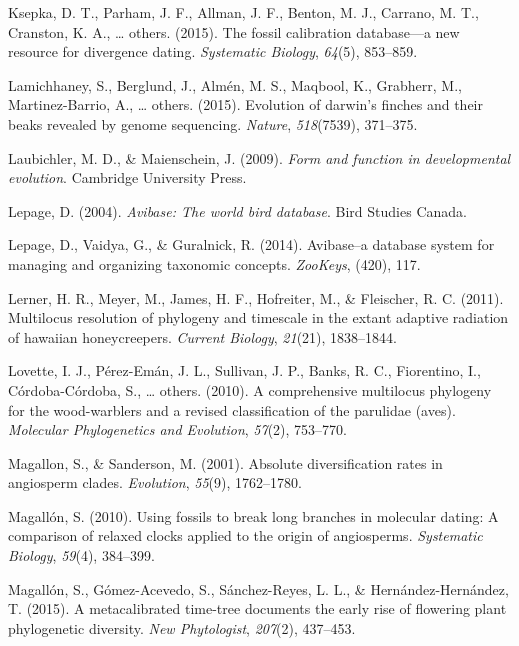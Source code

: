 \documentclass[english,man]{apa6}
\begin{document}
\leavevmode\hypertarget{ref-ksepka2015fossil}{}%
Ksepka, D. T., Parham, J. F., Allman, J. F., Benton, M. J., Carrano, M. T., Cranston, K. A., \ldots{} others. (2015). The fossil calibration database---a new resource for divergence dating. \emph{Systematic Biology}, \emph{64}(5), 853--859.

\leavevmode\hypertarget{ref-lamichhaney2015evolution}{}%
Lamichhaney, S., Berglund, J., Almén, M. S., Maqbool, K., Grabherr, M., Martinez-Barrio, A., \ldots{} others. (2015). Evolution of darwin's finches and their beaks revealed by genome sequencing. \emph{Nature}, \emph{518}(7539), 371--375.

\leavevmode\hypertarget{ref-laubichler2009form}{}%
Laubichler, M. D., \& Maienschein, J. (2009). \emph{Form and function in developmental evolution}. Cambridge University Press.

\leavevmode\hypertarget{ref-lepage2004avibase}{}%
Lepage, D. (2004). \emph{Avibase: The world bird database}. Bird Studies Canada.

\leavevmode\hypertarget{ref-lepage2014avibase}{}%
Lepage, D., Vaidya, G., \& Guralnick, R. (2014). Avibase--a database system for managing and organizing taxonomic concepts. \emph{ZooKeys}, (420), 117.

\leavevmode\hypertarget{ref-lerner2011multilocus}{}%
Lerner, H. R., Meyer, M., James, H. F., Hofreiter, M., \& Fleischer, R. C. (2011). Multilocus resolution of phylogeny and timescale in the extant adaptive radiation of hawaiian honeycreepers. \emph{Current Biology}, \emph{21}(21), 1838--1844.

\leavevmode\hypertarget{ref-lovette2010comprehensive}{}%
Lovette, I. J., Pérez-Emán, J. L., Sullivan, J. P., Banks, R. C., Fiorentino, I., Córdoba-Córdoba, S., \ldots{} others. (2010). A comprehensive multilocus phylogeny for the wood-warblers and a revised classification of the parulidae (aves). \emph{Molecular Phylogenetics and Evolution}, \emph{57}(2), 753--770.

\leavevmode\hypertarget{ref-magallon2001absolute}{}%
Magallon, S., \& Sanderson, M. (2001). Absolute diversification rates in angiosperm clades. \emph{Evolution}, \emph{55}(9), 1762--1780.

\leavevmode\hypertarget{ref-magallon2010using}{}%
Magallón, S. (2010). Using fossils to break long branches in molecular dating: A comparison of relaxed clocks applied to the origin of angiosperms. \emph{Systematic Biology}, \emph{59}(4), 384--399.

\leavevmode\hypertarget{ref-magallon2015metacalibrated}{}%
Magallón, S., Gómez-Acevedo, S., Sánchez-Reyes, L. L., \& Hernández-Hernández, T. (2015). A metacalibrated time-tree documents the early rise of flowering plant phylogenetic diversity. \emph{New Phytologist}, \emph{207}(2), 437--453.
\end{document}
